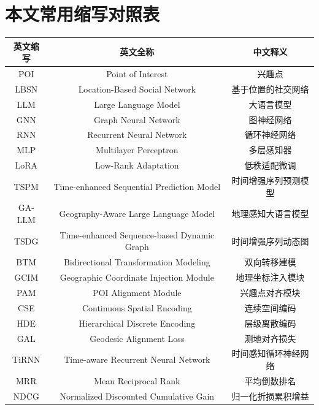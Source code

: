 \chapter{本文常用缩写对照表}
\label{app:abbr}

\begin{table}[h]
    \centering
    \renewcommand\arraystretch{1.4}
    \begin{tabular}{ccc}
        \toprule
        英文缩写 & 英文全称 & 中文释义 \\
        \midrule
        POI & Point of Interest & 兴趣点 \\
        LBSN & Location-Based Social Network & 基于位置的社交网络 \\
        LLM & Large Language Model & 大语言模型 \\
        GNN & Graph Neural Network & 图神经网络 \\
        RNN & Recurrent Neural Network & 循环神经网络 \\
        MLP & Multilayer Perceptron & 多层感知器 \\
        LoRA & Low-Rank Adaptation & 低秩适配微调 \\
        TSPM & Time-enhanced Sequential Prediction Model & 时间增强序列预测模型 \\
        GA-LLM & Geography-Aware Large Language Model & 地理感知大语言模型 \\
        TSDG & Time-enhanced Sequence-based Dynamic Graph & 时间增强序列动态图 \\
        BTM & Bidirectional Transformation Modeling & 双向转移建模 \\
        GCIM & Geographic Coordinate Injection Module & 地理坐标注入模块 \\
        PAM & POI Alignment Module & 兴趣点对齐模块 \\
        CSE & Continuous Spatial Encoding & 连续空间编码 \\
        HDE & Hierarchical Discrete Encoding & 层级离散编码 \\
        GAL & Geodesic Alignment Loss & 测地对齐损失 \\
        TiRNN & Time-aware Recurrent Neural Network & 时间感知循环神经网络 \\
        MRR & Mean Reciprocal Rank & 平均倒数排名 \\
        NDCG & Normalized Discounted Cumulative Gain & 归一化折损累积增益 \\
        \bottomrule
    \end{tabular}
\end{table}
